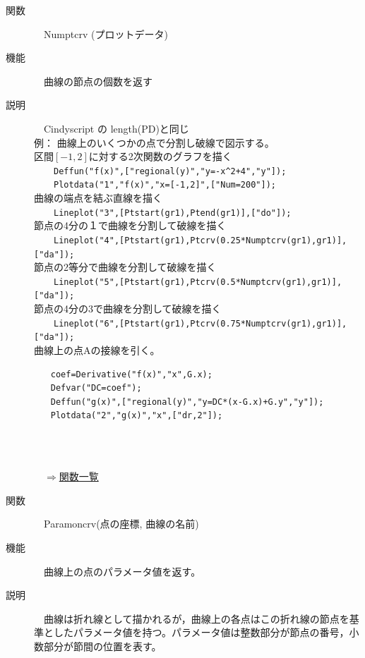 \documentclass[papersize,a4paper,12pt,uplatex]{jsarticle}
\begin{document}
\begin{description}
\hypertarget{numptcrv}{}
\item[関数]　Numptcrv (プロットデータ)
\item[機能]　曲線の節点の個数を返す
\item[説明]　Cindyscript の length(PD)と同じ\\

例： 曲線上のいくつかの点で分割し破線で図示する。\\
区間$[-1, 2]$に対する2次関数のグラフを描く\\
　　\verb|Deffun("f(x)",["regional(y)","y=-x^2+4","y"]);|\\
　　\verb|Plotdata("1","f(x)","x=[-1,2]",["Num=200"]);|\\
曲線の端点を結ぶ直線を描く\\
　　\verb|Lineplot("3",[Ptstart(gr1),Ptend(gr1)],["do"]);|\\
節点の4分の１で曲線を分割して破線を描く\\
　　\verb|Lineplot("4",[Ptstart(gr1),Ptcrv(0.25*Numptcrv(gr1),gr1)],["da"]); |\\
節点の2等分で曲線を分割して破線を描く\\
　　\verb|Lineplot("5",[Ptstart(gr1),Ptcrv(0.5*Numptcrv(gr1),gr1)],["da"]); |\\
節点の4分の3で曲線を分割して破線を描く\\
　　\verb|Lineplot("6",[Ptstart(gr1),Ptcrv(0.75*Numptcrv(gr1),gr1)],["da"]);| \\
曲線上の点Aの接線を引く。
\begin{verbatim}
　　coef=Derivative("f(x)","x",G.x);
　　Defvar("DC=coef");
　　Deffun("g(x)",["regional(y)","y=DC*(x-G.x)+G.y","y"]);
　　Plotdata("2","g(x)","x",["dr,2"]); 
\end{verbatim}
 　\\
\\

\begin{flushright}　\hyperlink{functionlist}{$\Rightarrow$関数一覧}\end{flushright}

\hypertarget{paramoncrv}{}
\item[関数]　Paramoncrv(点の座標, 曲線の名前)
\item[機能]　曲線上の点のパラメータ値を返す。
\item[説明]　曲線は折れ線として描かれるが，曲線上の各点はこの折れ線の節点を基準としたパラメータ値を持つ。パラメータ値は整数部分が節点の番号，小数部分が節間の位置を表す。\\


\end{description}
\end{document}
